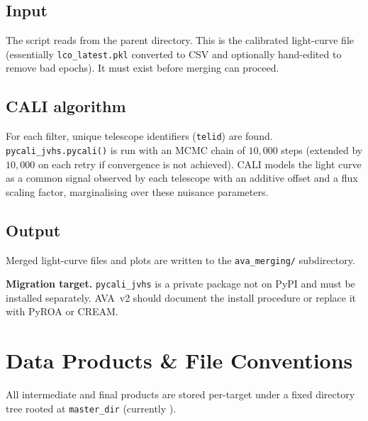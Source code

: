 \documentclass[12pt,a4paper]{article}
\begin{document}
\subsection{Input}

The script reads  from the parent directory.  This is the
calibrated light-curve file (essentially \texttt{lco\_latest.pkl} converted to CSV and
optionally hand-edited to remove bad epochs).  It must exist before merging can proceed.

\subsection{CALI algorithm}

For each filter, unique telescope identifiers (\texttt{telid}) are found.
\texttt{pycali\_\hspace{0pt}jvhs.pycali()} is run with an MCMC chain of $10{,}000$ steps (extended
by $10{,}000$ on each retry if convergence is not achieved).  CALI models the light curve
as a common signal observed by each telescope with an additive offset and a flux scaling
factor, marginalising over these nuisance parameters.

\subsection{Output}

Merged light-curve files and plots are written to the \texttt{ava\_merging/} subdirectory.

\begin{warnbox}
\textbf{Migration target.}  \texttt{pycali\_jvhs} is a private package not on PyPI and
must be installed separately.  AVA~v2 should document the install procedure or replace
it with PyROA or CREAM.
\end{warnbox}

\section{Data Products \& File Conventions}
\label{sec:products}

All intermediate and final products are stored per-target under a fixed directory tree
rooted at \texttt{master\_dir} (currently ).
\end{document}
